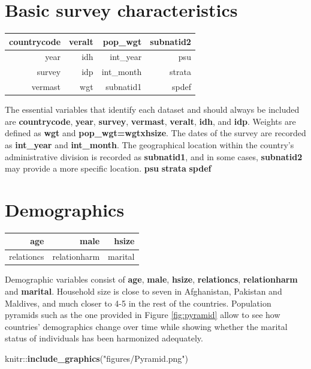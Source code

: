 \documentclass[13 pt,]{book}
\newenvironment{Shaded}{\begin{snugshade}}{\end{snugshade}}
\newcommand{\KeywordTok}[1]{\textcolor[rgb]{0.13,0.29,0.53}{\textbf{{#1}}}}
\newcommand{\StringTok}[1]{\textcolor[rgb]{0.31,0.60,0.02}{{#1}}}
\newcommand{\NormalTok}[1]{{#1}}
\begin{document}
\section{Basic survey
characteristics}\label{basic-survey-characteristics}

\begin{longtable}[]{@{}rrrr@{}}
\toprule
countrycode & veralt & pop\_wgt & subnatid2\tabularnewline
\midrule
\endhead
year & idh & int\_year & psu\tabularnewline
survey & idp & int\_month & strata\tabularnewline
vermast & wgt & subnatid1 & spdef\tabularnewline
\bottomrule
\end{longtable}

The essential variables that identify each dataset and should always be
included are \textbf{countrycode}, \textbf{year}, \textbf{survey},
\textbf{vermast}, \textbf{veralt}, \textbf{idh}, and \textbf{idp}.
Weights are defined as \textbf{wgt} and \textbf{pop\_wgt=wgtxhsize}. The
dates of the survey are recorded as \textbf{int\_year} and
\textbf{int\_month}. The geographical location within the country's
administrative division is recorded as \textbf{subnatid1}, and in some
cases, \textbf{subnatid2} may provide a more specific location.
\textbf{psu} \textbf{strata} \textbf{spdef}

\section{Demographics}\label{demographics}

\begin{longtable}[]{@{}rrr@{}}
\toprule
age & male & hsize\tabularnewline
\midrule
\endhead
relationcs & relationharm & marital\tabularnewline
\bottomrule
\end{longtable}

Demographic variables consist of \textbf{age}, \textbf{male},
\textbf{hsize}, \textbf{relationcs}, \textbf{relationharm} and
\textbf{marital}. Household size is close to seven in Afghanistan,
Pakistan and Maldives, and much closer to 4-5 in the rest of the
countries. Population pyramids such as the one provided in Figure
\ref{fig:pyramid} allow to see how countries' demographics change over
time while showing whether the marital status of individuals has been
harmonized adequately.

\begin{Shaded}
\begin{Highlighting}[]
\NormalTok{knitr::}\KeywordTok{include_graphics}\NormalTok{(}\StringTok{"figures/Pyramid.png"}\NormalTok{)}
\end{Highlighting}
\end{Shaded}
\end{document}
